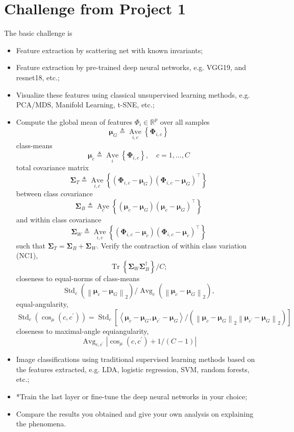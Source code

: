 \documentclass[11pt]{article}
\def\R{{\mathbb R}}
\begin{document}
\section{Challenge from Project 1}
The basic challenge is 
\begin{itemize}
\item Feature extraction by scattering net with known invariants; 
\item Feature extraction by pre-trained deep neural networks, e.g. VGG19, and resnet18, etc.;
\item Visualize these features using classical unsupervised learning methods, e.g. PCA/MDS, Manifold Learning, t-SNE, etc.; 
\item Compute the global mean of features $\Phi_i \in \R^p$ over all samples
\[ \boldsymbol{\mu}_{G} \triangleq \underset{i, c}{\operatorname{Ave}}\left\{\boldsymbol{\Phi}_{i, c}\right\} \]
class-means
\[ \boldsymbol{\mu}_{c} \triangleq \underset{i}{\operatorname{Ave}}\left\{\boldsymbol{\Phi}_{i, c}\right\}, \quad c=1, \ldots, C \]
total covariance matrix
\[ \boldsymbol{\Sigma}_{T} \triangleq \underset{i, c}{\operatorname{Ave}}\left\{\left(\boldsymbol{\Phi}_{i, c}-\boldsymbol{\mu}_{G}\right)\left(\boldsymbol{\Phi}_{i, c}-\boldsymbol{\mu}_{G}\right)^{\top}\right\} \]
between class covariance
\[ \boldsymbol{\Sigma}_{B} \triangleq \underset{c}{\operatorname{Ave}}\left\{\left(\boldsymbol{\mu}_{c}-\boldsymbol{\mu}_{G}\right)\left(\boldsymbol{\mu}_{c}-\boldsymbol{\mu}_{G}\right)^{\top}\right\} \]
and within class covariance
\[ \boldsymbol{\Sigma}_{W} \triangleq \underset{i, c}{\operatorname{Ave}}\left\{\left(\boldsymbol{\Phi}_{i, c}-\boldsymbol{\mu}_{c}\right)\left(\boldsymbol{\Phi}_{i, c}-\boldsymbol{\mu}_{c}\right)^{\top}\right\} \]
such that $\boldsymbol{\Sigma}_{T}=\boldsymbol{\Sigma}_{B}+\boldsymbol{\Sigma}_{W}$. Verify the contraction of within class variation (NC1), 
\[ \operatorname{Tr}\left\{\boldsymbol{\Sigma}_{W} \boldsymbol{\Sigma}_{B}^{\dagger}\right\} / C; \]
closeness to equal-norms of class-means
\[ \operatorname{Std}_{c}\left(\left\|\boldsymbol{\mu}_{c}-\boldsymbol{\mu}_{G}\right\|_{2}\right) / \operatorname{Avg}_{c}\left(\left\|\boldsymbol{\mu}_{c}-\boldsymbol{\mu}_{G}\right\|_{2}\right), \] 
equal-angularity, 
\[ \operatorname{Std}_{c} \left(\operatorname{cos}_{\mu}\left(c, c^{\prime}\right)\right)=\operatorname{Std}_{c} [\left\langle\boldsymbol{\mu}_{c}-\boldsymbol{\mu}_{G}, \boldsymbol{\mu}_{c^{\prime}}-\boldsymbol{\mu}_{G}\right\rangle /\left(\left\|\boldsymbol{\mu}_{c}-\boldsymbol{\mu}_{G}\right\|_{2}\left\|\boldsymbol{\mu}_{c^{\prime}}-\boldsymbol{\mu}_{G}\right\|_{2}\right) ]\]
closeness to maximal-angle equiangularity,
\[ \operatorname{Avg}_{c, c^{\prime}}\left|\cos _{\mu}\left(c, c^{\prime}\right)+1 /(C-1)\right|\]
\item Image classifications using traditional supervised learning methods based on the features extracted, e.g. LDA, logistic regression, SVM, random forests, etc.;
\item *Train the last layer or fine-tune the deep neural networks in your choice; 
\item Compare the results you obtained and give your own analysis on explaining the phenomena.
\end{itemize}
\end{document}

